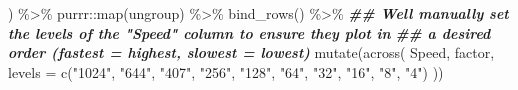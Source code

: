 \documentclass[
]{book}
\newenvironment{Shaded}{\begin{snugshade}}{\end{snugshade}}
\newcommand{\AttributeTok}[1]{\textcolor[rgb]{0.77,0.63,0.00}{#1}}
\newcommand{\DocumentationTok}[1]{\textcolor[rgb]{0.56,0.35,0.01}{\textbf{\textit{#1}}}}
\newcommand{\FunctionTok}[1]{\textcolor[rgb]{0.00,0.00,0.00}{#1}}
\newcommand{\NormalTok}[1]{#1}
\newcommand{\SpecialCharTok}[1]{\textcolor[rgb]{0.00,0.00,0.00}{#1}}
\newcommand{\StringTok}[1]{\textcolor[rgb]{0.31,0.60,0.02}{#1}}
\begin{document}
\begin{Shaded}
\begin{Highlighting}[]
\NormalTok{    ) }\SpecialCharTok{\%\textgreater{}\%}
\NormalTok{    purrr}\SpecialCharTok{::}\FunctionTok{map}\NormalTok{(ungroup) }\SpecialCharTok{\%\textgreater{}\%}
    \FunctionTok{bind\_rows}\NormalTok{() }\SpecialCharTok{\%\textgreater{}\%}
    \DocumentationTok{\#\# We\textquotesingle{}ll manually set the levels of the "Speed" column to ensure they plot in}
    \DocumentationTok{\#\# a desired order (fastest = highest, slowest = lowest)}
    \FunctionTok{mutate}\NormalTok{(}\FunctionTok{across}\NormalTok{(}
\NormalTok{      Speed,}
\NormalTok{      factor,}
      \AttributeTok{levels =} \FunctionTok{c}\NormalTok{(}\StringTok{"1024"}\NormalTok{, }\StringTok{"644"}\NormalTok{, }\StringTok{"407"}\NormalTok{, }\StringTok{"256"}\NormalTok{, }\StringTok{"128"}\NormalTok{, }\StringTok{"64"}\NormalTok{, }\StringTok{"32"}\NormalTok{, }\StringTok{"16"}\NormalTok{, }\StringTok{"8"}\NormalTok{, }\StringTok{"4"}\NormalTok{)}
\NormalTok{    ))}


\end{Highlighting}
\end{Shaded}
\end{document}
